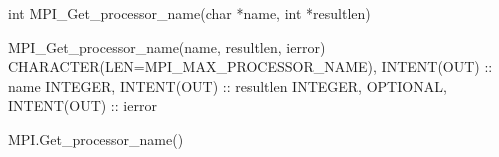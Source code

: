 int MPI_Get_processor_name(char *name, int *resultlen)

MPI_Get_processor_name(name, resultlen, ierror)
CHARACTER(LEN=MPI_MAX_PROCESSOR_NAME), INTENT(OUT) :: name
INTEGER, INTENT(OUT) :: resultlen
INTEGER, OPTIONAL, INTENT(OUT) :: ierror 

MPI.Get_processor_name()
